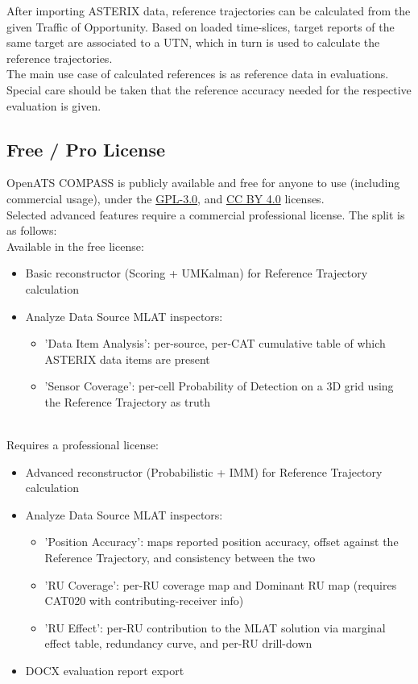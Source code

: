 After importing ASTERIX data, reference trajectories can be calculated from the given Traffic of Opportunity. Based on loaded time-slices, target reports of the same target are associated to a UTN, which in turn is used to calculate the reference trajectories. \\

The main use case of calculated references is as reference data in evaluations. Special care should be taken that the reference accuracy needed for the respective evaluation is given. \\

\subsection*{Free / Pro License}

OpenATS COMPASS is publicly available and free for anyone to use (including commercial usage), under the \href{https://www.gnu.org/licenses/gpl-3.0.en.html}{GPL-3.0}, and \href{https://creativecommons.org/licenses/by/4.0/}{CC BY 4.0} licenses. \\

Selected advanced features require a commercial professional license. The split is as follows: \\

Available in the free license:
\begin{itemize}
\item Basic reconstructor (Scoring + UMKalman) for Reference Trajectory calculation
\item Analyze Data Source MLAT inspectors:
\begin{itemize}
\item 'Data Item Analysis': per-source, per-CAT cumulative table of which ASTERIX data items are present
\item 'Sensor Coverage': per-cell Probability of Detection on a 3D grid using the Reference Trajectory as truth
\end{itemize}
\end{itemize}
\ \\

Requires a professional license:
\begin{itemize}
\item Advanced reconstructor (Probabilistic + IMM) for Reference Trajectory calculation
\item Analyze Data Source MLAT inspectors:
\begin{itemize}
\item 'Position Accuracy': maps reported position accuracy, offset against the Reference Trajectory, and consistency between the two
\item 'RU Coverage': per-RU coverage map and Dominant RU map (requires CAT020 with contributing-receiver info)
\item 'RU Effect': per-RU contribution to the MLAT solution via marginal effect table, redundancy curve, and per-RU drill-down
\end{itemize}
\item DOCX evaluation report export
\end{itemize}
\ \\

